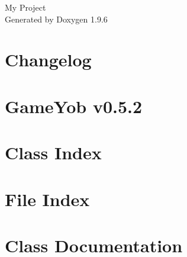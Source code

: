 \documentclass[twoside]{book}
\newcommand{\+}{\discretionary{\mbox{\scriptsize$\hookleftarrow$}}{}{}}
\newcommand{\clearemptydoublepage}{%
    \newpage{\pagestyle{empty}\cleardoublepage}%
  }
\begin{document}
  \raggedbottom
    \hypersetup{pageanchor=false,
                bookmarksnumbered=true,
                pdfencoding=unicode
               }
  \begin{titlepage}
  \vspace*{7cm}
  \begin{center}%
  {\Large My Project}\\
  \vspace*{1cm}
  {\large Generated by Doxygen 1.9.6}\\
  \end{center}
  \end{titlepage}
  \clearemptydoublepage
  \tableofcontents
  \clearemptydoublepage
  \hypersetup{pageanchor=true}
\chapter{Changelog}
\label{md__c_h_a_n_g_e_l_o_g}

\chapter{Game\+Yob v0.5.2}
\label{md__r_e_a_d_m_e}

\chapter{Class Index}

\chapter{File Index}

\chapter{Class Documentation}

















\end{document}
